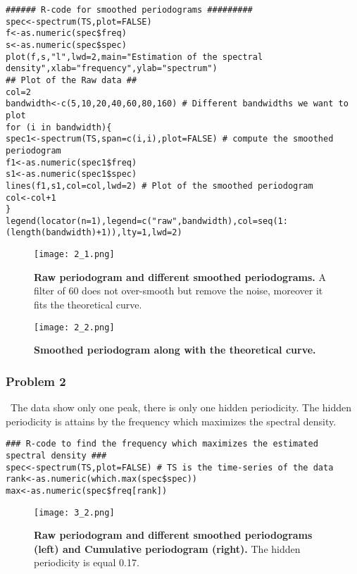 \documentclass{article}
\begin{document}
\begin{verbatim}
###### R-code for smoothed periodograms #########
spec<-spectrum(TS,plot=FALSE)
f<-as.numeric(spec$freq)
s<-as.numeric(spec$spec)
plot(f,s,"l",lwd=2,main="Estimation of the spectral density",xlab="frequency",ylab="spectrum") 
## Plot of the Raw data ##
col=2
bandwidth<-c(5,10,20,40,60,80,160) # Different bandwidths we want to plot
for (i in bandwidth){
spec1<-spectrum(TS,span=c(i,i),plot=FALSE) # compute the smoothed periodogram
f1<-as.numeric(spec1$freq)
s1<-as.numeric(spec1$spec)
lines(f1,s1,col=col,lwd=2) # Plot of the smoothed periodogram
col<-col+1
}
legend(locator(n=1),legend=c("raw",bandwidth),col=seq(1:(length(bandwidth)+1)),lty=1,lwd=2)
\end{verbatim}




\begin{figure}[H]
	\centering
  	\texttt{[image: 2\_1.png]}
  	\caption{\textbf{Raw periodogram and different smoothed periodograms.} A filter of 60 does not over-smooth but remove the noise, moreover it fits the theoretical curve.}
\end{figure}

\begin{figure}[H]
	\centering
  	\texttt{[image: 2\_2.png]}
  	\caption{\textbf{Smoothed periodogram along with the theoretical curve.}}
\end{figure}

\subsubsection*{Problem 2}
\
The data show only one peak, there is only one hidden periodicity. The hidden periodicity is attains by the frequency which maximizes the spectral density. 
\begin{verbatim}
### R-code to find the frequency which maximizes the estimated spectral density ###
spec<-spectrum(TS,plot=FALSE) # TS is the time-series of the data
rank<-as.numeric(which.max(spec$spec))
max<-as.numeric(spec$freq[rank])
\end{verbatim}

\begin{figure}[H]
	\centering
  	\texttt{[image: 3\_2.png]}
  	\caption{\textbf{Raw periodogram and different smoothed periodograms (left) and Cumulative periodogram (right).} The hidden periodicity is equal 0.17.}
\end{figure}
\end{document}
